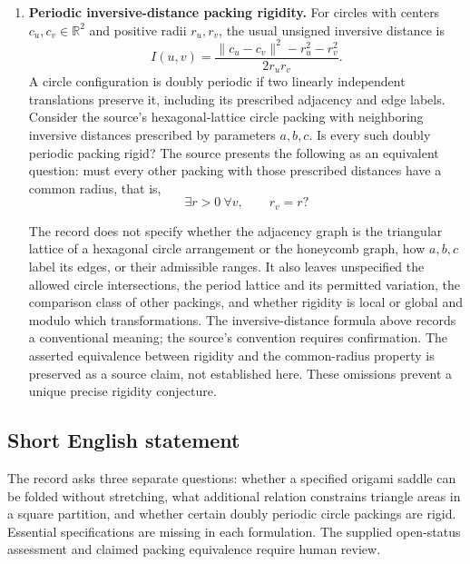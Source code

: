 \documentclass[11pt]{article}
\newcommand{\R}{\mathbb{R}}
\begin{document}
\begin{enumerate}
The supplied record does not identify a fixed triangulation, restrictions on vertices, the intended sign convention beyond the displayed normalization, or the class of relations sought. It does not say whether the additional relation may depend on the partition's combinatorics, or what independence from the sum relation means. Thus it does not determine a specific additional identity or a fully quantified conjecture asserting one.

\item \textbf{Periodic inversive-distance packing rigidity.} For circles with centers \(c_u,c_v\in\R^2\) and positive radii \(r_u,r_v\), the usual unsigned inversive distance is
\[
 I(u,v)=\frac{\lVert c_u-c_v\rVert^2-r_u^2-r_v^2}{2r_ur_v}.
\]
A circle configuration is doubly periodic if two linearly independent translations preserve it, including its prescribed adjacency and edge labels. Consider the source's hexagonal-lattice circle packing with neighboring inversive distances prescribed by parameters \(a,b,c\). Is every such doubly periodic packing rigid? The source presents the following as an equivalent question: must every other packing with those prescribed distances have a common radius, that is,
\[
 \exists r>0\ \forall v,\qquad r_v=r?
\]

The record does not specify whether the adjacency graph is the triangular lattice of a hexagonal circle arrangement or the honeycomb graph, how \(a,b,c\) label its edges, or their admissible ranges. It also leaves unspecified the allowed circle intersections, the period lattice and its permitted variation, the comparison class of other packings, and whether rigidity is local or global and modulo which transformations. The inversive-distance formula above records a conventional meaning; the source's convention requires confirmation. The asserted equivalence between rigidity and the common-radius property is preserved as a source claim, not established here. These omissions prevent a unique precise rigidity conjecture.
\end{enumerate}
\subsection{Short English statement}
The record asks three separate questions: whether a specified origami saddle can be folded without stretching, what additional relation constrains triangle areas in a square partition, and whether certain doubly periodic circle packings are rigid. Essential specifications are missing in each formulation. The supplied open-status assessment and claimed packing equivalence require human review.
\end{document}
